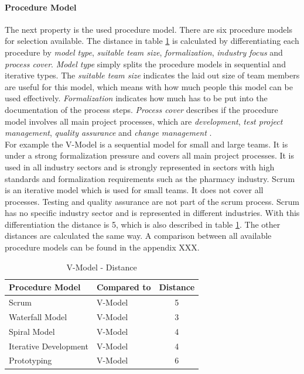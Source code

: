 \paragraph*{\textbf{Procedure Model}}
The next property is the used procedure model. There are six procedure models for selection available. The distance in table \ref{property:proceduremodel} is calculated by differentiating each procedure by \textit{model type}, \textit{suitable team size}, \textit{formalization}, \textit{industry focus} and \textit{process cover}. \textit{Model type} simply splits the procedure models in sequential and iterative types. The \textit{suitable team size} indicates the laid out size of team members are useful for this model, which means with how much people this model can be used effectively. \textit{Formalization} indicates how much has to be put into the documentation of the process steps. \textit{Process cover} describes if the procedure model involves all main project processes, which are \textit{development}, \textit{test project management}, \textit{quality assurance} and \textit{change management} \cite{incom}.\\
For example the V-Model is a sequential model for small and large teams. It is under a strong formalization pressure and covers all main project processes. It is used in all industry sectors and is strongly represented in sectors with high standards and formalization requirements such as the pharmacy industry. Scrum is an iterative model which is used for small teams. It does not cover all processes. Testing and quality assurance are not part of the scrum process. Scrum has no specific industry sector and is represented in different industries. With this differentiation the distance is 5, which is also described in table \ref{property:proceduremodel}. The other distances are calculated the same way. A comparison between all available procedure models can be found in the appendix XXX.
\begin{table}[h]
	\centering 
	\setlength{\tabcolsep}{4pt}
	\begin{tabular}{|l|l|c|}\hline
		Procedure Model			& Compared to 	&  Distance 	\\ \hline
		Scrum   				& V-Model		& 5      		\\ \hline
		Waterfall Model   		& V-Model 		& 3      		\\ \hline
		Spiral Model   			& V-Model 		& 4     		\\ \hline
		Iterative Development   & V-Model 		& 4     		\\ \hline
		Prototyping  			& V-Model 		& 6     		\\ \hline
	\end{tabular} 
	\caption{V-Model - Distance} 
	\label{property:proceduremodel} 
\end{table}

